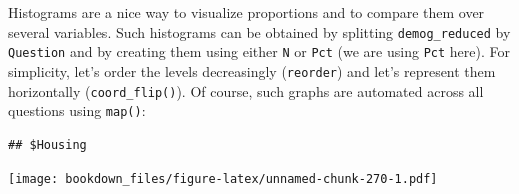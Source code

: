 \documentclass[
]{krantz}
\makeatletter
\newenvironment{Shaded}{\begin{snugshade}}{\end{snugshade}}
\newcommand{\AttributeTok}[1]{\textcolor[rgb]{0.61,0.61,0.61}{#1}}
\newcommand{\ControlFlowTok}[1]{\textcolor[rgb]{0.27,0.27,0.27}{\textbf{#1}}}
\newcommand{\DecValTok}[1]{\textcolor[rgb]{0.06,0.06,0.06}{#1}}
\newcommand{\FunctionTok}[1]{\textcolor[rgb]{0,0,0}{#1}}
\newcommand{\NormalTok}[1]{#1}
\newcommand{\OtherTok}[1]{\textcolor[rgb]{0.37,0.37,0.37}{#1}}
\newcommand{\SpecialCharTok}[1]{\textcolor[rgb]{0,0,0}{#1}}
\newcommand{\StringTok}[1]{\textcolor[rgb]{0.5,0.5,0.5}{#1}}
\newenvironment{kframe}{%
\medskip{}
\setlength{\fboxsep}{.8em}
 \def\at@end@of@kframe{}%
 \ifinner\ifhmode%
  \def\at@end@of@kframe{\end{minipage}}%
  \begin{minipage}{\columnwidth}%
 \fi\fi%
 \def\FrameCommand##1{\hskip\@totalleftmargin \hskip-\fboxsep
 \colorbox{shadecolor}{##1}\hskip-\fboxsep
     \hskip-\linewidth \hskip-\@totalleftmargin \hskip\columnwidth}%
 \MakeFramed {\advance\hsize-\width
   \@totalleftmargin\z@ \linewidth\hsize
   \@setminipage}}%
 {\par\unskip\endMakeFramed%
 \at@end@of@kframe}
\renewenvironment{Shaded}{\begin{kframe}}{\end{kframe}}
\makeatother
\begin{document}
Histograms are a nice way to visualize proportions and to compare them over several variables. Such histograms can be obtained by splitting \texttt{demog\_reduced} by \texttt{Question} and by creating them using either \texttt{N} or \texttt{Pct} (we are using \texttt{Pct} here). For simplicity, let's order the levels decreasingly (\texttt{reorder}) and let's represent them horizontally (\texttt{coord\_flip()}). Of course, such graphs are automated across all questions using \texttt{map()}:

\begin{Shaded}
\end{Shaded}

\begin{verbatim}
## $Housing
\end{verbatim}

\texttt{[image: bookdown\_files/figure-latex/unnamed-chunk-270-1.pdf]}
\end{document}
